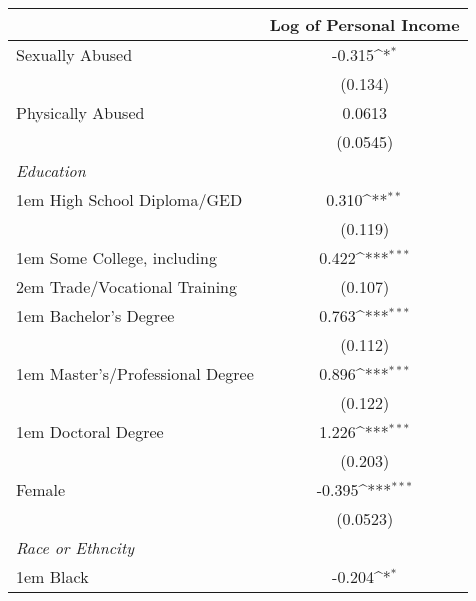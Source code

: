 \documentclass[9pt]{extarticle}
\begin{document}
\pagebreak
{
\def\sym#1{\ifmmode^{#1}\else\(^{#1}\)\fi}
\begin{longtable}[l]{l*{1}{c}}
\hline\hline
                                                  &\multicolumn{1}{c}{Log of Personal Income}\\
\hline
Sexually Abused 								  &                   -0.315\sym{*}  \\
                                                  &                  (0.134)         \\
[0.3em]
Physically Abused 								  &                   0.0613         \\
                                                  &                 (0.0545)         \\
[0.3em]
\emph{Education} 								  &									 \\
[0.3em]
\kern 1em High School Diploma/GED                 &                    0.310\sym{**} \\
                                                  &                  (0.119)         \\
[0.3em]
\kern 1em Some College, including		          &                    0.422\sym{***}\\
\kern 2em Trade/Vocational Training               &                  (0.107)         \\
[0.3em]
\kern 1em Bachelor's Degree                       &                    0.763\sym{***}\\
                                                  &                  (0.112)         \\
[0.3em]
\kern 1em Master's/Professional Degree            &                    0.896\sym{***}\\
                                                  &                  (0.122)         \\
[0.3em]
\kern 1em Doctoral Degree                         &                    1.226\sym{***}\\
                                                  &                  (0.203)         \\
[0.3em]
Female 			                                  &                   -0.395\sym{***}\\
                                                  &                 (0.0523)         \\
[0.3em]
\emph{Race or Ethncity}  			  &									 \\
[0.3em]
\kern 1em Black                                   &                   -0.204\sym{*}  \\

\end{longtable}}
\end{document}
